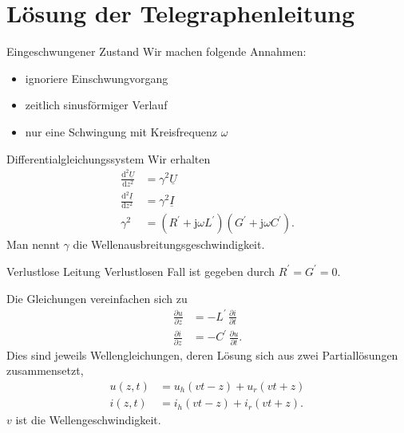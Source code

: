 \documentclass{beamer}
\begin{document}
\section{Lösung der Telegraphenleitung}


\begin{frame}{Eingeschwungener Zustand}
Wir machen folgende Annahmen:
\begin{itemize}
    \item<1-> ignoriere Einschwungvorgang
    \item<2-> zeitlich sinusförmiger Verlauf
    \item<3-> nur eine Schwingung mit Kreisfrequenz $\omega$
\end{itemize}

\vspace*{1em}

\end{frame}


\begin{frame}{Differentialgleichungssystem}
Wir erhalten
\begin{align}
    \frac{\text{d}^{2} \underline{U}}{\text{d} z^{2}} &= \gamma^{2} \underline{U} \label{eq:VerlustDgl1} \\[1ex]
    \frac{\text{d}^{2} \underline{I}}{\text{d} z^{2}} &= \gamma^{2} \underline{I} \label{eq:VerlustDgl2} \\[1ex]
    \gamma^{2} &= \left( R^{\prime} + \mathrm{j} \omega L^{\prime} \right) \left( G^{\prime} + \mathrm{j} \omega
    C^{\prime} \right) \label{eq:Gamma}.
\end{align}
Man nennt $\gamma$ die Wellenausbreitungsgeschwindigkeit.

\end{frame}


\begin{frame}{Verlustlose Leitung}
Verlustlosen Fall ist gegeben durch \mbox{$R^{\prime} = G^{\prime} = 0$}.

Die Gleichungen vereinfachen sich zu
\begin{align}
    \frac{\partial u}{\partial z} &= - L^{\prime} \, \frac{\partial i}{\partial t} \label{eq:Dgl7} \\[1ex]
    \frac{\partial i}{\partial z} &= - C^{\prime} \, \frac{\partial u}{\partial t} \label{eq:Dgl8} .
\end{align}
Dies sind jeweils Wellengleichungen, deren Lösung sich aus zwei Partiallösungen zusammensetzt,
\begin{align}
    u(z, t) &= u_{h}(v t - z) + u_{r}(v t + z) \label{eq:AllgEq1} \\[1ex]
    i(z, t) &= i_{h}(v t - z) + i_{r}(v t + z) \label{eq:AllgEq2}.
\end{align}
$v$ ist die Wellengeschwindigkeit.
\end{frame}
\end{document}

